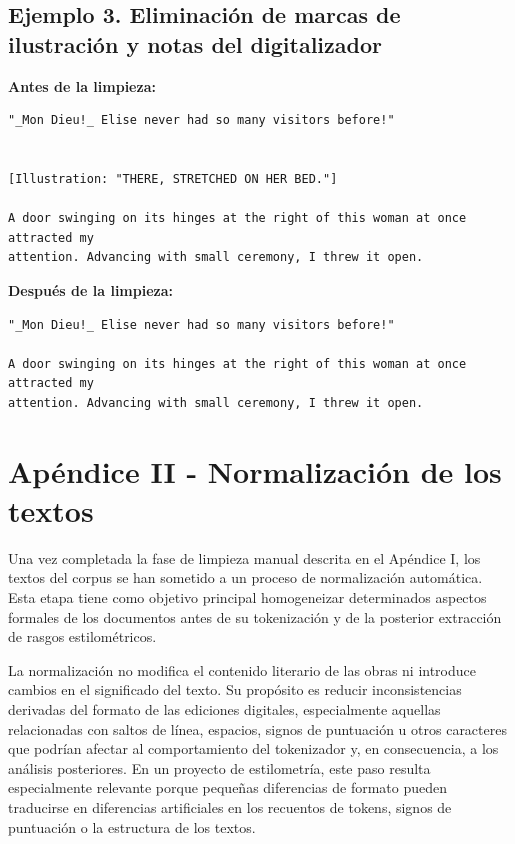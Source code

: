 \documentclass[IB]{TFUOC}%
\begin{document}
\subsection*{Ejemplo 3. Eliminación de marcas de ilustración y notas del digitalizador}

\textbf{Antes de la limpieza:}

\begin{verbatim}
"_Mon Dieu!_ Elise never had so many visitors before!"


[Illustration: "THERE, STRETCHED ON HER BED."]

A door swinging on its hinges at the right of this woman at once attracted my
attention. Advancing with small ceremony, I threw it open.
\end{verbatim}

\textbf{Después de la limpieza:}

\begin{verbatim}
"_Mon Dieu!_ Elise never had so many visitors before!"

A door swinging on its hinges at the right of this woman at once attracted my
attention. Advancing with small ceremony, I threw it open.
\end{verbatim}

\section*{Apéndice II - Normalización de los textos}
\label{apx:normalizacion}

Una vez completada la fase de limpieza manual descrita en el Apéndice I, los textos del corpus se han sometido a un proceso de normalización automática. Esta etapa tiene como objetivo principal homogeneizar determinados aspectos formales de los documentos antes de su tokenización y de la posterior extracción de rasgos estilométricos.

La normalización no modifica el contenido literario de las obras ni introduce cambios en el significado del texto. Su propósito es reducir inconsistencias derivadas del formato de las ediciones digitales, especialmente aquellas relacionadas con saltos de línea, espacios, signos de puntuación u otros caracteres que podrían afectar al comportamiento del tokenizador y, en consecuencia, a los análisis posteriores. En un proyecto de estilometría, este paso resulta especialmente relevante porque pequeñas diferencias de formato pueden traducirse en diferencias artificiales en los recuentos de tokens, signos de puntuación o la estructura de los textos.
\end{document}
